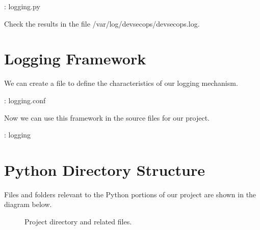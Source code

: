 \begin{mybox}{\thetcbcounter: logging.py}
    
\end{mybox}

\justifying
Check the results in the file /var/log/devsecops/devsecops.log.

\section{Logging Framework}

\justifying
We can create a file to define the characteristics of our logging mechanism.

\begin{mybox}{\thetcbcounter: logging.conf}
	
\end{mybox}

\justifying
Now we can use this framework in the source files for our project.

\begin{mybox}{\thetcbcounter: logging}
	
\end{mybox}

\section{Python Directory Structure}
\justifying
Files and folders relevant to the Python portions of our project are shown in the diagram below.

\begin{figure}[!htb]
	\centering
	
	\caption{Project directory and related files.}
	\label{pythonfiles}
\end{figure}

